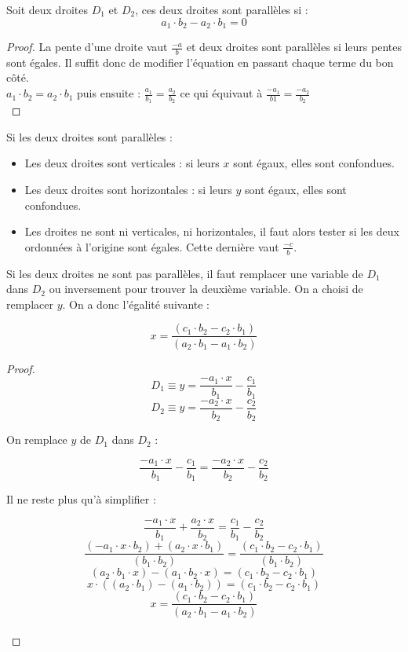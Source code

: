 \documentclass[]{report}
\begin{document}
Soit deux droites $D_1$ et $D_2$, ces deux droites sont parallèles si : 
$$ a_1 \cdot b_2 - a_2 \cdot b_1 = 0 $$

\begin{proof}
La pente d'une droite vaut $\frac{-a}{b}$ et deux droites sont parallèles
si leurs pentes sont égales. Il suffit donc de modifier l'équation en passant chaque terme du bon côté. \\
$ a_1 \cdot b_2 = a_2 \cdot b_1 $ puis ensuite : $ \frac{a_1}{b_1} = \frac{a_2}{b_2} $ ce qui équivaut à
$ \frac{-a_1}{b1} = \frac{-a_2}{b_2} $ \\
\end{proof}

Si les deux droites sont parallèles : 
\begin{itemize}
    \item Les deux droites sont verticales : si leurs $x$ sont égaux, elles sont confondues.
    \item Les deux droites sont horizontales : si leurs $y$ sont égaux, elles sont confondues.
    \item Les droites ne sont ni verticales, ni horizontales, il faut alors tester si les deux
        ordonnées à l'origine sont égales. Cette dernière vaut $\frac{-c}{b}$. \\
\end{itemize}

Si les deux droites ne sont pas parallèles, il faut remplacer une variable de $D_1$ dans $D_2$
ou inversement pour trouver la deuxième variable. On a choisi de remplacer $y$.
On a donc l'égalité suivante : 

$$ x = \frac{(c_1 \cdot b_2 - c_2 \cdot b_1)}{(a_2 \cdot b_1 - a_1 \cdot b_2)} $$

\begin{proof}
$$ D_1 \equiv y = \frac{-a_1 \cdot x}{b_1} - \frac{c_1}{b_1} $$
$$ D_2 \equiv y = \frac{-a_2 \cdot x}{b_2} - \frac{c_2}{b_2} $$

On remplace $y$ de $D_1$ dans $D_2$ :

$$ \frac{-a_1 \cdot x}{b_1} - \frac{c_1}{b_1} = \frac{-a_2 \cdot x}{b_2} - \frac{c_2}{b_2} $$

Il ne reste plus qu'à simplifier :

$$ \frac{-a_1 \cdot x}{b_1} + \frac{a_2 \cdot x}{b_2} = \frac{c_1}{b_1} - \frac{c_2}{b_2} $$
$$ \frac{(-a_1 \cdot x \cdot b_2) + (a_2 \cdot x \cdot b_1)}{(b_1 \cdot b_2)} = \frac{(c_1 \cdot b_2 - c_2 \cdot b_1)}{(b_1 \cdot b_2)} $$
$$ (a_2 \cdot b_1 \cdot x) - (a_1 \cdot b_2 \cdot x) = (c_1 \cdot b_2 - c_2 \cdot b_1) $$
$$ x \cdot ((a_2 \cdot b_1) - (a_1 \cdot b_2)) = (c_1 \cdot b_2 - c_2 \cdot b_1) $$
$$ x = \frac{(c_1 \cdot b_2 - c_2 \cdot b_1)}{(a_2 \cdot b_1 - a_1 \cdot b_2)} $$ \\
\end{proof}
\end{document}
